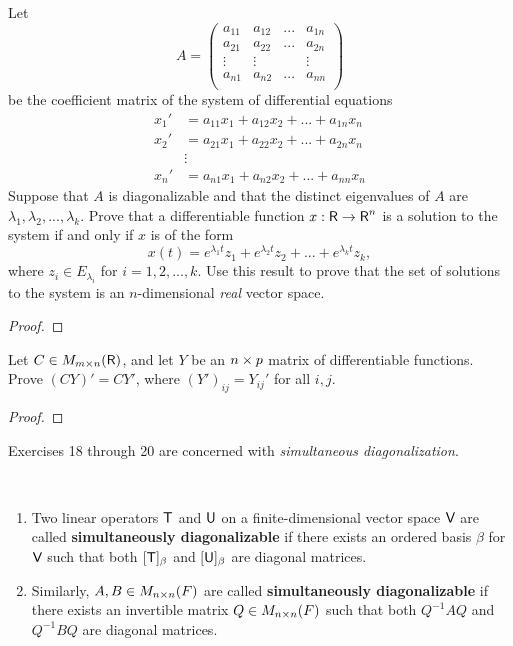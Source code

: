 \begin{exercise} \label{exercise 5.2.16}
Let
\[
    A = \begin{pmatrix}
        a_{11} & a_{12} & ... & a_{1n} \\
        a_{21} & a_{22} & ... & a_{2n} \\
        \vdots & \vdots &     & \vdots \\
        a_{n1} & a_{n2} & ... & a_{nn} \\
    \end{pmatrix}
\]
be the coefficient matrix of the system of differential equations
\begin{align*}
    x_1' & = a_{11} x_1 + a_{12} x_2 + ... + a_{1n} x_n \\
    x_2' & = a_{21} x_1 + a_{22} x_2 + ... + a_{2n} x_n \\
    & \vdots \\
    x_n' & = a_{n1} x_1 + a_{n2} x_2 + ... + a_{nn} x_n
\end{align*}
Suppose that \(A\) is diagonalizable and that the distinct eigenvalues of \(A\) are \(\lambda_1, \lambda_2, ..., \lambda_k\).
Prove that a differentiable function \(x: \textsf{R} \to \textsf{R}^n\) is a
solution to the system if and only if \(x\) is of the form
\[
    x(t) = e^{\lambda_1 t} z_1 + e^{\lambda_2 t} z_2 + ... + e^{\lambda_k t} z_k,
\]
where \(z_i \in E_{\lambda_i}\) for \(i = 1, 2, ..., k\).
Use this result to prove that the set of solutions to the system is an \(n\)-dimensional \emph{real} vector space.
\end{exercise}

\begin{proof}
\end{proof}

\begin{exercise} \label{exercise 5.2.17}
Let \(C \in M_{m \times n}(\textsf{R})\), and let \(Y\) be an \(n \times p\) matrix of differentiable functions.
Prove \((CY)' = CY'\), where \((Y')_{ij} = Y_{ij}'\) for all \(i, j\).
\end{exercise}

\begin{proof}
\end{proof}

Exercises 18 through 20 are concerned with \emph{simultaneous diagonalization}.

\begin{additional definition} \label{adef 5.1} \ 
\begin{enumerate}
\item Two linear operators \(\textsf{T}\) and \(\textsf{U}\) on a finite-dimensional vector space \(\textsf{V}\) are called \textbf{simultaneously diagonalizable} if there exists an ordered basis \(\beta\) for \(\textsf{V}\) such that both \([\textsf{T}]_{\beta}\) and \([\textsf{U}]_{\beta}\) are diagonal matrices.
\item Similarly, \(A, B \in M_{n \times n}(F)\) are called \textbf{simultaneously diagonalizable} if there exists an invertible matrix \(Q \in M_{n \times n}(F)\) such that both \(Q^{-1} A Q\) and \(Q^{-1} B Q\) are diagonal matrices.
\end{enumerate}
\end{additional definition}

